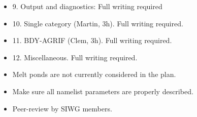 \documentclass[../main/SI3_manual]{subfiles}
\begin{document}
\begin{itemize}
\item 9. Output and diagnostics: Full writing required

\item 10. Single category (Martin, 3h). Full writing required.

\item 11. BDY-AGRIF (Clem, 3h). Full writing required.

\item 12. Miscellaneous. Full writing required.

\item Melt ponds are not currently considered in the plan.

\item Make sure all namelist parameters are properly described.

\item Peer-review by SIWG members.

\end{itemize}
\end{document}
